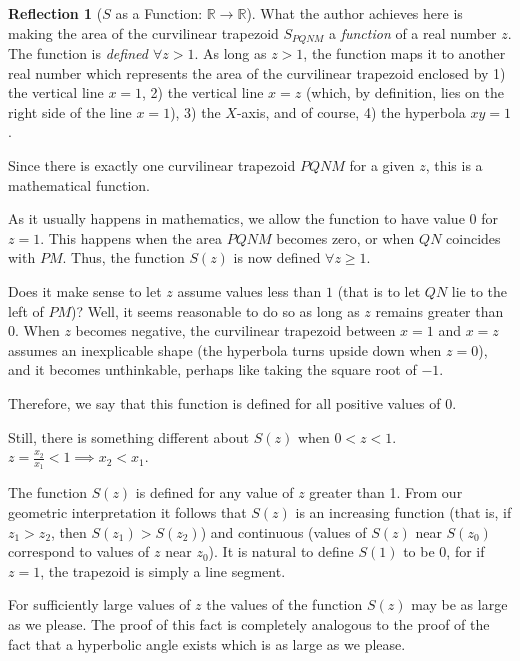 \documentclass[11pt]{article}
\theoremstyle{definition}
\theoremstyle{plain}
\theoremstyle{problemstyle}
\theoremstyle{remark}
\theoremstyle{definition}
\newtheorem{reflection}{Reflection}
\begin{document}
\begin{reflection}[$S$ as a Function: $\mathbb{R}\rightarrow\mathbb{R}$]
    \label{reflection:s-as-a-function-of-z}
    What the author achieves here is making the area of the curvilinear trapezoid $S_{PQNM}$ a \emph{function} of a real number $z$. The function is \emph{defined $\forall z>1$}. As long as $z>1$, the function maps it to another real number which represents the area of the curvilinear trapezoid enclosed by 1) the vertical line $x=1$, 2) the vertical line $x=z$ (which, by definition, lies on the right side of the line $x=1$), 3) the $X$-axis, and of course, 4) the hyperbola $xy=1$.

    Since there is exactly one curvilinear trapezoid $PQNM$ for a given $z$, this is a mathematical function.

    As it usually happens in mathematics, we allow the function to have value $0$ for $z=1$. This happens when the area $PQNM$ becomes zero, or when $QN$ coincides with $PM$. Thus, the function $S(z)$ is now defined $\forall z\geq 1$.

    Does it make sense to let $z$ assume values less than $1$ (that is to let $QN$ lie to the left of $PM$)? Well, it seems reasonable to do so as long as $z$ remains greater than $0$. When $z$ becomes negative, the curvilinear trapezoid between $x=1$ and $x=z$ assumes an inexplicable shape (the hyperbola turns upside down when $z=0$), and it becomes unthinkable, perhaps like taking the square root of $-1$.

    Therefore, we say that this function is defined for all positive values of $0$.

    Still, there is something different about $S(z)$ when $0<z<1$. $z=\frac{x_2}{x_1} < 1 \implies x_2 < x_1$.
\end{reflection}

The function $S(z)$ is defined for any value of $z$ greater than 1.  From our geometric interpretation it follows that $S(z)$ is an increasing function (that is, if $z_1>z_2$, then $S(z_1) > S(z_2)$) and continuous (values of $S(z)$ near $S(z_0)$ correspond to values of $z$ near $z_0$). It is natural to define $S(1)$ to be $0$, for if $z=1$, the trapezoid is simply a line segment. 

For sufficiently large values of $z$ the values of the function $S(z)$ may be as large as we please. The proof of this fact is completely analogous to the proof of the fact that a hyperbolic angle exists which is as large as we please. 
\end{document}
